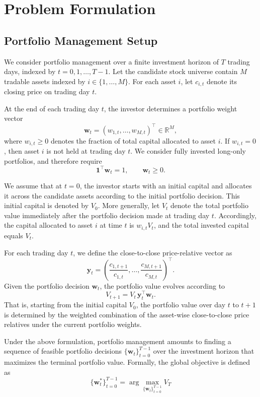 \documentclass[letterpaper]{article} %
\begin{document}
\section{Problem Formulation}
\subsection{Portfolio Management Setup}

We consider portfolio management over a finite investment horizon of $T$ trading days, indexed by $t=0,1,\dots,T-1$. Let the candidate stock universe contain $M$ tradable assets indexed by $i\in\{1,\dots,M\}$. For each asset $i$, let $c_{i,t}$ denote its closing price on trading day $t$.

At the end of each trading day $t$, the investor determines a portfolio weight vector
\[
\mathbf{w}_t = (w_{1,t},\dots,w_{M,t})^\top \in \mathbb{R}^M,
\]
where $w_{i,t}\ge 0$ denotes the fraction of total capital allocated to asset $i$. If $w_{i,t}=0$, then asset $i$ is not held at trading day $t$. We consider fully invested long-only portfolios, and therefore require
\[
\mathbf{1}^\top \mathbf{w}_t = 1,\qquad \mathbf{w}_t \ge 0.
\]

We assume that at $t=0$, the investor starts with an initial capital and allocates it across the candidate assets according to the initial portfolio decision. This initial capital is denoted by $V_0$. More generally, let $V_t$ denote the total portfolio value immediately after the portfolio decision made at trading day $t$. Accordingly, the capital allocated to asset $i$ at time $t$ is $w_{i,t}V_t$, and the total invested capital equals $V_t$.

For each trading day $t$, we define the close-to-close price-relative vector as
\[
\mathbf{y}_t
=
\left(
\frac{c_{1,t+1}}{c_{1,t}},
\dots,
\frac{c_{M,t+1}}{c_{M,t}}
\right)^\top.
\]
Given the portfolio decision $\mathbf{w}_t$, the portfolio value evolves according to
\[
V_{t+1} = V_t\, \mathbf{y}_t^\top \mathbf{w}_t.
\]
That is, starting from the initial capital $V_0$, the portfolio value over day $t$ to $t+1$ is determined by the weighted combination of the asset-wise close-to-close price relatives under the current portfolio weights.

Under the above formulation, portfolio management amounts to finding a sequence of feasible portfolio decisions $\{\mathbf{w}_t\}_{t=0}^{T-1}$ over the investment horizon that maximizes the terminal portfolio value. Formally, the global objective is defined as
\[
\{\mathbf{w}_t^*\}_{t=0}^{T-1}
=
\arg\max_{\{\mathbf{w}_t\}_{t=0}^{T-1}}
V_T
\]
\end{document}
